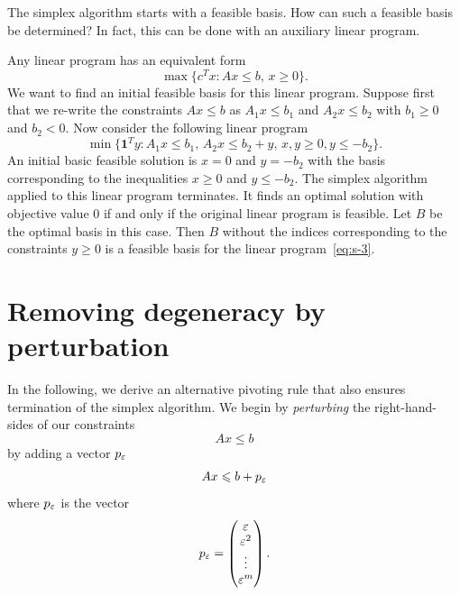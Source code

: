 The simplex algorithm starts with a feasible basis. How can such a feasible basis be determined? In fact, this can be done with an auxiliary linear program. 

Any linear program has an equivalent form 
\begin{equation}
  \label{eq:s-3}
  \max\{ c^Tx \colon Ax \leq b, \, x \geq 0\}. 
\end{equation}
  We want to find an initial feasible basis for this linear program. Suppose first that we re-write the constraints $Ax \leq b$ as $A_1x\leq b_1$ and $A_2x\leq b_2$ with $b_1 \geq 0$ and $b_2<0$. Now consider the following linear program
  \begin{equation}
    \label{eq:s-151}    
  \min\{ \mathbf{1}^Ty \colon A_1x \leq b_1, \, A_2x \leq b_2 +y, \, x,y \geq 0, y \leq -b_2\}. 
\end{equation}
An initial basic feasible solution is $x=0$ and $y= -b_2$ with the basis corresponding to the inequalities $x\geq 0$ and $y \leq -b_2$. The simplex algorithm applied to this linear program terminates. It finds an optimal solution with objective value $0$ if and only if the original linear program is feasible. Let $B$ be the optimal basis in this case. Then $B$ without the indices corresponding to the constraints $y\geq 0$ is a feasible basis for the linear program~\eqref{eq:s-3}. 


\section{Removing degeneracy by perturbation}
\label{sec:remov-degen-pert}

In the following, we derive an alternative pivoting rule that also ensures termination of the simplex algorithm. We begin by \emph{perturbing} the right-hand-sides of our constraints 
\begin{equation}
  \label{eq:pert-2}
  Ax \leq b
\end{equation}
by adding a vector $p_{\varepsilon}$ 
\begin{equation}
  \label{eq:per-1}
  Ax \leqslant b + p_{\varepsilon} 
\end{equation}
where $p_{\varepsilon}$ is the vector 
\begin{displaymath}
p_{\varepsilon} = 
  \begin{pmatrix}
    {\varepsilon}\\ {\varepsilon}^2\\ \vdots \\ {\varepsilon}^m
  \end{pmatrix}.
\end{displaymath}

